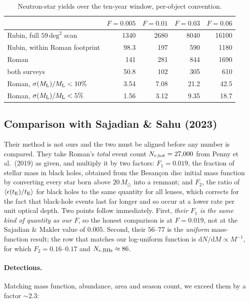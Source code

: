 \documentclass[english,10pt,a4paper]{article}
\newcommand{\tE}{t_{\rm E}}
\newcommand{\Ml}{M_{\rm L}}
\newcommand{\Msun}{M_\odot}
\begin{document}
\begin{table}[h]
\centering
\caption{Neutron-star yields over the ten-year window, per-object convention.}
\label{tab:yieldns}
\begin{tabular}{lrrrr}
\toprule
 & $F=0.005$ & $F=0.01$ & $F=0.03$ & $F=0.06$ \\
\midrule
Rubin, full $59\,\mathrm{deg}^2$ scan & 1340 & 2680 & 8040 & 16100 \\
Rubin, within Roman footprint         & 98.3 & 197  & 590  & 1180  \\
Roman                                 & 141  & 281  & 844  & 1690  \\
both surveys                          & 50.8 & 102  & 305  & 610   \\
Roman, $\sigma(\Ml)/\Ml<10\%$         & 3.54 & 7.08 & 21.2 & 42.5  \\
Roman, $\sigma(\Ml)/\Ml<5\%$          & 1.56 & 3.12 & 9.35 & 18.7  \\
\bottomrule
\end{tabular}
\end{table}

\subsection{Comparison with Sajadian \& Sahu (2023)}

Their method is not ours and the two must be aligned before any number is compared. They take
Roman's \emph{total} event count $N_{e,\rm tot}=27{,}000$ from Penny et al.\ (2019) as given, and
multiply it by two factors: $F_1 = 0.019$, the fraction of stellar mass in black holes, obtained
from the Besan\c{c}on disc initial mass function by converting every star born above $20\,\Msun$
into a remnant; and $F_2$, the ratio of $\langle\epsilon(\tE)/\tE\rangle$ for black holes to the
same quantity for all lenses, which corrects for the fact that black-hole events last far longer
and so occur at a lower rate per unit optical depth. Two points follow immediately. First,
\emph{their $F_1$ is the same kind of quantity as our $F$}, so the honest comparison is at
$F = 0.019$, not at the Sajadian \& Makler value of $0.005$. Second, their $56$--$77$ is the
\emph{uniform} mass-function result; the row that matches our log-uniform function is
$\mathrm{d}N/\mathrm{d}M \propto M^{-1}$, for which $F_2 = 0.16$--$0.17$ and
$N_{e,\rm BHs} \approx 86$.

\paragraph{Detections.} Matching mass function, abundance, area and season count, we exceed them
by a factor $\sim\!2.3$:
\end{document}
